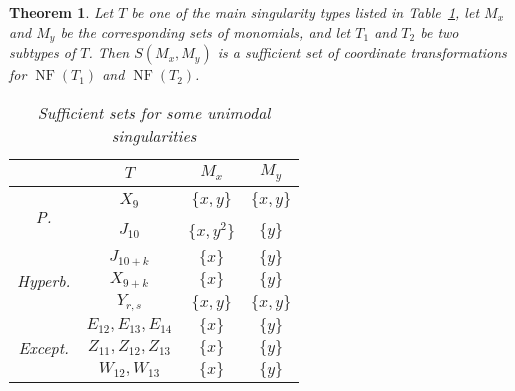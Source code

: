 \documentclass[noend]{amsproc}
\newtheorem{theorem}{Theorem}
\theoremstyle{definition}
\DeclareMathOperator{\NF}{NF}
\begin{document}
\begin{theorem}\label{thm:sufficient_sets}
Let $T$ be one of the main singularity types listed in
Table~\ref{tab:sufficient_sets}, let $M_x$ and $M_y$ be the corresponding sets
of monomials, and let $T_1$ and $T_2$ be two subtypes of $T$. Then
$S(M_x, M_y)$ is a sufficient set of coordinate transformations for $\NF(T_1)$
and $\NF(T_2)$.

\begin{table}[htb]
\centering
\caption{Sufficient sets for some unimodal singularities}
\label{tab:sufficient_sets}
\begin{tabular}{|c|c|c|c|}
\hline

& $T$ & $M_x$ & $M_y$ \\
\hline\hline


\multirow{2}{*}{\begin{sideways}P.\end{sideways}}

& $X_9$    & $\{x, y\}$   & $\{x, y\}$ \\ \cline{2-4}
& $J_{10}$ & $\{x, y^2\}$ & $\{y\}$    \\ \hline


\multirow{3}{*}{\begin{sideways}Hyperb.\end{sideways}}

& $J_{10+k}$ & $\{x\}$    & $\{y\}$    \\ \cline{2-4}
& $X_{9+k}$  & $\{x\}$    & $\{y\}$    \\ \cline{2-4}
& $Y_{r,s}$  & $\{x, y\}$ & $\{x, y\}$ \\ \hline


\multirow{3}{*}{\begin{sideways}Except.\end{sideways}}

& $E_{12}, E_{13}, E_{14}$ & $\{x\}$ & $\{y\}$ \\ \cline{2-4}
& $Z_{11}, Z_{12}, Z_{13}$ & $\{x\}$ & $\{y\}$ \\ \cline{2-4}
& $W_{12}, W_{13}$         & $\{x\}$ & $\{y\}$ \\ \hline

\end{tabular}
\end{table}

\end{theorem}
\end{document}

